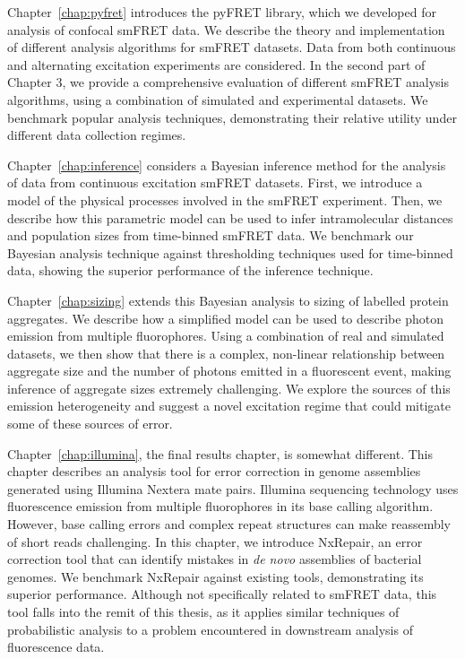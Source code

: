 Chapter~\ref{chap:pyfret} introduces the pyFRET library, which we developed for analysis of confocal smFRET data. We describe the theory and implementation of different analysis algorithms for smFRET datasets. Data from both continuous and alternating excitation experiments are considered. In the second part of Chapter 3, we provide a comprehensive evaluation of different smFRET analysis algorithms, using a combination of simulated and experimental datasets. We benchmark popular analysis techniques, demonstrating their relative utility under different data collection regimes. 


Chapter~\ref{chap:inference} considers a Bayesian inference method for the analysis of data from continuous excitation smFRET datasets. First, we introduce a model of the physical processes involved in the smFRET experiment. Then, we describe how this parametric model can be used to infer intramolecular distances and population sizes from time-binned smFRET data. We benchmark our Bayesian analysis technique against thresholding techniques used for time-binned data, showing the superior performance of the inference technique.

Chapter~\ref{chap:sizing} extends this Bayesian analysis to sizing of labelled protein aggregates. We describe how a simplified model can be used to describe photon emission from multiple fluorophores. Using a combination of real and simulated datasets, we then show that there is a complex, non-linear relationship between aggregate size and the number of photons emitted in a fluorescent event, making inference of aggregate sizes extremely challenging. We explore the sources of this emission heterogeneity and suggest a novel excitation regime that could mitigate some of these sources of error.

Chapter~\ref{chap:illumina}, the final results chapter, is somewhat different. This chapter describes an analysis tool for error correction in genome assemblies generated using Illumina Nextera mate pairs. Illumina sequencing technology uses fluorescence emission from multiple fluorophores in its base calling algorithm. However, base calling errors and complex repeat structures can make reassembly of short reads challenging. In this chapter, we introduce NxRepair, an error correction tool that can identify mistakes in \emph{de novo} assemblies of bacterial genomes. We benchmark NxRepair against existing tools, demonstrating its superior performance. Although not specifically related to smFRET data, this tool falls into the remit of this thesis, as it applies similar techniques of probabilistic analysis to a problem encountered in downstream analysis of fluorescence data.

